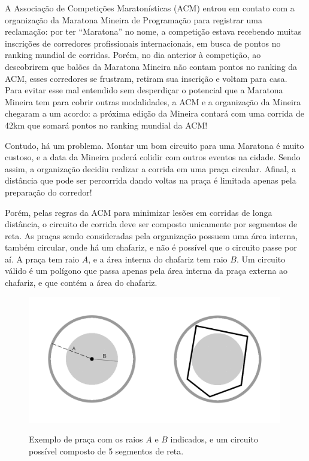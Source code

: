 A Associação de Competições Maratonísticas (ACM) entrou em contato com a organização da Maratona Mineira de Programação para registrar uma reclamação:
por ter ``Maratona'' no nome, a competição estava recebendo muitas inscrições de corredores profissionais internacionais, em busca de pontos no
ranking mundial de corridas. Porém, no dia anterior à competição,
ao descobrirem que balões da Maratona Mineira não contam pontos no ranking da ACM, esses corredores se frustram, retiram
sua inscrição e voltam para casa.
Para evitar esse mal entendido sem desperdiçar o potencial que a Maratona Mineira tem para cobrir outras modalidades,
a ACM e a organização da Mineira chegaram
a um acordo: a próxima edição da Mineira contará com uma corrida de 42km que somará pontos no ranking mundial da ACM!

Contudo, há um problema. Montar um bom circuito para uma Maratona é muito custoso, e a data da Mineira poderá colidir
com outros eventos na cidade. Sendo assim, a organização decidiu realizar a corrida em uma praça circular. Afinal, a distância que
pode ser percorrida dando voltas na praça é limitada apenas pela preparação do corredor!

Porém, pelas regras da ACM para minimizar lesões em corridas de longa distância, o circuito de corrida deve ser composto
unicamente por segmentos de reta.
As praças sendo consideradas pela organização possuem uma área interna, também circular, onde há um chafariz, e não é possível que o circuito
passe por aí. A praça tem raio $A$, e a área interna do chafariz tem raio $B$. Um circuito válido é um polígono que passa apenas pela área interna
da praça externa ao chafariz, e que contém a área do chafariz.

\begin{figure}[h]
\begin{center}
\includegraphics[height=15em]{correndo}
\begin{quote}
\caption{Exemplo de praça com os raios $A$ e $B$ indicados, e um circuito possível composto de 5 segmentos de reta.}
\end{quote}
\end{center}
\end{figure}


